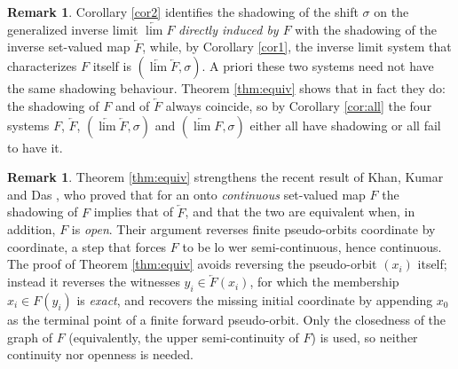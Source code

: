\documentclass[12pt]{amsart}
\theoremstyle{definition}
\newtheorem{remark}[theorem]{Remark}
\begin{document}
\begin{remark}\label{rem:bridge}
	Corollary \ref{cor2} identifies the shadowing of the shift $\sigma$ on the generalized inverse limit $\underleftarrow{\lim} F$ \emph{directly induced by $F$} with the shadowing of the inverse set-valued map $\underleftarrow{F}$, while, by Corollary \ref{cor1}, the inverse limit system that characterizes $F$ itself is $(\underleftarrow{\lim} \underleftarrow{F},\sigma)$. A priori these two systems need not have the same shadowing behaviour. Theorem \ref{thm:equiv} shows that in fact they do: the shadowing of $F$ and of $\underleftarrow{F}$ always coincide, so by Corollary \ref{cor:all} the four systems $F$, $\underleftarrow{F}$, $(\underleftarrow{\lim} \underleftarrow{F},\sigma)$ and $(\underleftarrow{\lim} F,\sigma)$ either all have shadowing or all fail to have it.
\end{remark}

\begin{remark}\label{rem:strengthen}
	Theorem \ref{thm:equiv} strengthens the recent result of Khan, Kumar and Das \cite{KhanKumarDas}, who proved that for an onto \emph{continuous} set-valued map $F$ the shadowing of $F$ implies that of $\underleftarrow{F}$, and that the two are equivalent when, in addition, $F$ is \emph{open}. Their argument reverses finite pseudo-orbits coordinate by coordinate, a step that forces $F$ to be lo
	wer semi-continuous, hence continuous. The proof of Theorem \ref{thm:equiv} avoids reversing the pseudo-orbit $(x_i)$ itself; instead it reverses the witnesses $y_i\in\underleftarrow{F}(x_i)$, for which the membership $x_i\in F(y_i)$ is \emph{exact}, and recovers the missing initial coordinate by appending $x_0$ as the terminal point of a finite forward pseudo-orbit. Only the closedness of the graph of $F$ (equivalently, the upper semi-continuity of $F$) is used, so neither continuity nor openness is needed.
\end{remark}
\end{document}
